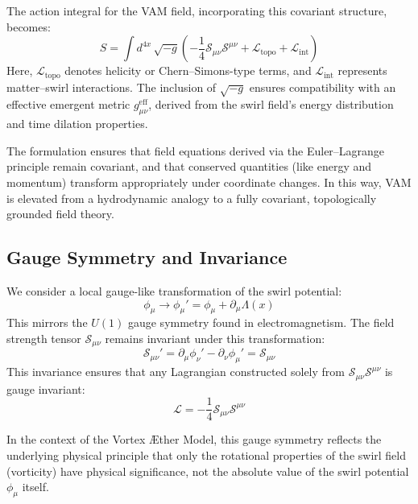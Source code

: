         The action integral for the VAM field, incorporating this covariant structure, becomes:
        \begin{equation}
            S = \int d^{4x} \, \sqrt{-g} \left( -\frac{1}{4} \mathcal{S}_{\mu\nu} \mathcal{S}^{\mu\nu} + \mathcal{L}_{\text{topo}} + \mathcal{L}_{\text{int}} \right)
        \end{equation}
        Here, $\mathcal{L}_{\text{topo}}$ denotes helicity or Chern–Simons-type terms, and $\mathcal{L}_{\text{int}}$ represents matter–swirl interactions. The inclusion of $\sqrt{-g}$ ensures compatibility with an effective emergent metric $g_{\mu\nu}^{\text{eff}}$, derived from the swirl field's energy distribution and time dilation properties.

        The formulation ensures that field equations derived via the Euler–Lagrange principle remain covariant, and that conserved quantities (like energy and momentum) transform appropriately under coordinate changes. In this way, VAM is elevated from a hydrodynamic analogy to a fully covariant, topologically grounded field theory.

        \subsection{Gauge Symmetry and Invariance}
        We consider a local gauge-like transformation of the swirl potential:
        \begin{equation}
            \phi_\mu \rightarrow \phi_\mu' = \phi_\mu + \partial_\mu \Lambda(x)
        \end{equation}
        This mirrors the $U(1)$ gauge symmetry found in electromagnetism. The field strength tensor $\mathcal{S}_{\mu\nu}$ remains invariant under this transformation:
        \begin{equation}
            \mathcal{S}_{\mu\nu}' = \partial_\mu \phi_\nu' - \partial_\nu \phi_\mu' = \mathcal{S}_{\mu\nu}
        \end{equation}
        This invariance ensures that any Lagrangian constructed solely from $\mathcal{S}_{\mu\nu} \mathcal{S}^{\mu\nu}$ is gauge invariant:
        \begin{equation}
            \mathcal{L} = -\frac{1}{4} \mathcal{S}_{\mu\nu} \mathcal{S}^{\mu\nu}
        \end{equation}

        In the context of the Vortex Æther Model, this gauge symmetry reflects the underlying physical principle that only the
        rotational properties of the swirl field (vorticity) have physical significance, not the absolute value of the swirl potential $\phi_\mu$ itself.

